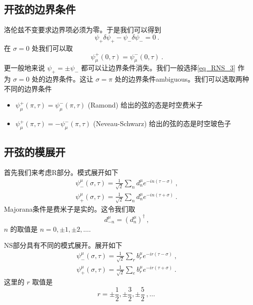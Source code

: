 \subsection{开弦的边界条件}
洛伦兹不变要求边界项必须为零。于是我们可以得到
\begin{equation}
\psi_+ \delta \psi_+ - \psi_- \delta \psi_- = 0~.
\end{equation}
在 $\sigma = 0$ 处我们可以取
\begin{equation}\label{eq_RNS_3}
\psi^+_\mu(0,\tau) = \psi^-_{\mu} (0,\tau) ~.
\end{equation}
更一般地来说 $\psi_+ = \pm \psi_-$ 都可以让边界条件消失。我们一般选择\autoref{eq_RNS_3} 作为 $\sigma = 0$ 处的边界条件。这让 $\sigma = \pi$ 处的边界条件ambiguous。我们可以选取两种不同的边界条件
\begin{itemize}
\item $\psi^+_\mu(\pi,\tau) = \psi^-_\mu(\pi,\tau)$ (Ramond)
给出的弦的态是时空费米子
\item $\psi^+_\mu(\pi,\tau) = - \psi^-_\mu(\pi,\tau)$ (Neveau-Schwarz) 给出的弦的态是时空玻色子
\end{itemize}

\subsection{开弦的模展开}
首先我们来考虑R部分。模式展开如下
\begin{equation}
\begin{aligned}
\psi^\mu_-(\sigma,\tau) = \frac{1}{\sqrt{2}} \sum_n d^\mu_n e^{- i n (\tau-\sigma)}~, \\
\psi^\mu_+(\sigma, \tau ) = \frac{1}{\sqrt{2}} \sum_n d^\mu_n e^{- i n (\tau+\sigma)}~.
\end{aligned}
\end{equation}
Majorana条件是费米子是实的。这令我们取
\begin{equation}
d^\mu_{-n} = (d^\mu_n)^\dagger~,
\end{equation}
$n$ 的取值是 $n=0,\pm 1,\pm 2,\ldots$.

NS部分具有不同的模式展开。展开如下
\begin{equation}
\begin{aligned}
\psi^\mu_-(\sigma,\tau) = \frac{1}{\sqrt{2}} \sum_r b^\mu_r e^{- i r(\tau-\sigma)}~, \\
\psi^\mu_+(\sigma,\tau) = \frac{1}{\sqrt{2}} \sum_e b^\mu_r e^{- i r (\tau+\sigma)}~.
\end{aligned}
\end{equation}
这里的 $r$ 取值是
\begin{equation}
r = \pm \frac{1}{2}, \pm \frac{3}{2}, \pm \frac{5}{2}~, \ldots~
\end{equation}

